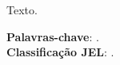 

\begin{resumo}
	\SingleSpacing
	
	Texto.
	
	\noindent 
	\textbf{Palavras-chave}: . \\
	\textbf{Classificação JEL}: .
\end{resumo}


